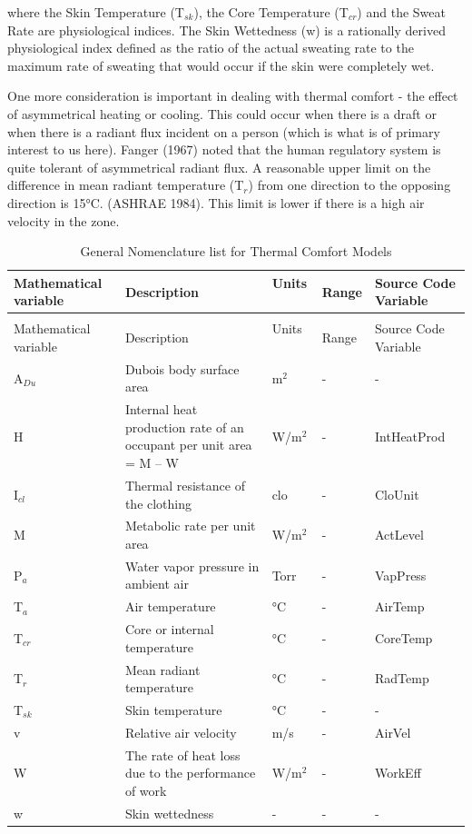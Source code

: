 where the Skin Temperature (T\(_{sk}\)), the Core Temperature (T\(_{cr}\)) and the Sweat Rate are physiological indices. The Skin Wettedness (w) is a rationally derived physiological index defined as the ratio of the actual sweating rate to the maximum rate of sweating that would occur if the skin were completely wet.

One more consideration is important in dealing with thermal comfort - the effect of asymmetrical heating or cooling. This could occur when there is a draft or when there is a radiant flux incident on a person (which is what is of primary interest to us here). Fanger (1967) noted that the human regulatory system is quite tolerant of asymmetrical radiant flux. A reasonable upper limit on the difference in mean radiant temperature (T\(_{r}\)) from one direction to the opposing direction is 15°C. (ASHRAE 1984). This limit is lower if there is a high air velocity in the zone.

\begin{longtable}[c]{p{1.2in}p{2.0in}p{0.8in}p{0.8in}p{1.2in}}
\caption{General Nomenclature list for Thermal Comfort Models \label{table:general-nomenclature-list-for-thermal-comfort}} \tabularnewline
\toprule 
Mathematical variable & Description & Units ~ & Range & Source Code Variable \tabularnewline
\midrule
\endfirsthead

\caption[]{General Nomenclature list for Thermal Comfort Models} \tabularnewline
\toprule 
Mathematical variable & Description & Units ~ & Range & Source Code Variable \tabularnewline
\midrule
\endhead

A\(_{Du}\) & Dubois body surface area & m\(^{2}\) & - & - \tabularnewline
H & Internal heat production rate of an occupant per unit area = M – W & W/m\(^{2}\) & - & IntHeatProd \tabularnewline
I\(_{cl}\) & Thermal resistance of the clothing & clo & - & CloUnit \tabularnewline
M & Metabolic rate per unit area & W/m\(^{2}\) & - & ActLevel \tabularnewline
P\(_{a}\) & Water vapor pressure in ambient air & Torr & - & VapPress \tabularnewline
T\(_{a}\) & Air temperature & °C & - & AirTemp \tabularnewline
T\(_{cr}\) & Core or internal temperature & °C & - & CoreTemp \tabularnewline
T\(_{r}\) & Mean radiant temperature & °C & - & RadTemp \tabularnewline
T\(_{sk}\) & Skin temperature & °C & - & - \tabularnewline
v & Relative air velocity & m/s & - & AirVel \tabularnewline
W & The rate of heat loss due to the performance of work & W/m\(^{2}\) & - & WorkEff \tabularnewline
w & Skin wettedness & - & - & - \tabularnewline
\bottomrule
\end{longtable}

